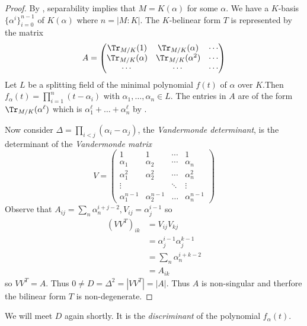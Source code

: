 \documentclass[a4paper]{article}
\begin{document}
\begin{proof}
  \label{proof:vandermonde}
  By , separability implies that \(M = K(\alpha)\) for some \(\alpha\). We have a \(K\)-basis \(\{\alpha^i\}_{i = 0}^{n - 1}\) of \(K(\alpha)\) where \(n = |M:K|\). The \(K\)-belinear form \(T\) is represented by the matrix
  \[
    A =
    \begin{pmatrix}
      \Tr_{M/K}(1) & \Tr_{M/K}(\alpha) & \cdots \\
      \Tr_{M/K}(\alpha) & \Tr_{M/K}(\alpha^2) & \cdots \\
      \cdots & \cdots & \cdots
    \end{pmatrix}
  \]
  Let \(L\) be a splitting field of the minimal polynomial \(f(t)\) of \(\alpha\) over \(K\).Then \(f_\alpha(t) = \prod_{i = 1}^n (t - \alpha_i)\) with \(\alpha_1, \dots, \alpha_n \in L\). The entries in \(A\) are of the form \(\Tr_{M/K}(\alpha^\ell)\) which is \(\alpha_1^\ell + \dots + \alpha_n^\ell\) by .

  Now consider \(\Delta = \prod_{i < j} (\alpha_i - \alpha_j)\), the \emph{Vandermonde determinant}, is the determinant of the \emph{Vandermonde matrix}
  \[
    V =
    \begin{pmatrix}
      1 & 1 & \cdots & 1 \\
      \alpha_1 & \alpha_2 & \cdots & \alpha_n \\
      \alpha_1^2 & \alpha_2^2 & \cdots & \alpha_n^2 \\
      \vdots & & \ddots & \vdots \\
      \alpha_1^{n - 1} & \alpha_2^{n - 1} & \dots & \alpha_n^{n - 1}
    \end{pmatrix}
  \]
  Observe that \(A_{ij} = \sum_n \alpha_n^{i + j - 2}, V_{ij} = \alpha_j^{i - 1}\) so
  \begin{align*}
    (VV^T)_{ik} &= V_{ij}V_{kj} \\
                &= \alpha_j^{i - 1} \alpha_j^{k - 1} \\
                &= \sum_n \alpha_n^{i + k - 2} \\
                &= A_{ik}
  \end{align*}
  so \(VV^T = A\). Thus \(0 \neq D = \Delta^2 = |VV^T| = |A|\). Thus \(A\) is non-singular and therfore the bilinear form \(T\) is non-degenerate.
\end{proof}

\begin{remark}
  We will meet \(D\) again shortly. It is the \emph{discriminant} of the polynomial \(f_\alpha(t)\).
\end{remark}
\end{document}
